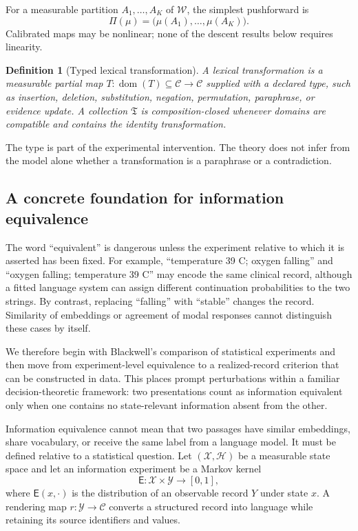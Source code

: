 \documentclass[11pt]{article}
\newtheorem{definition}{Definition}[section]
\newcommand{\Ctxt}{\mathcal C}
\newcommand{\Words}{\mathcal W}
\newcommand{\Trans}{\mathfrak T}
\newcommand{\Exp}{\mathsf E}
\begin{document}
For a measurable partition $A_1,\ldots,A_K$ of $\Words$, the simplest pushforward is
\[
\Pi(\mu)=\bigl(\mu(A_1),\ldots,\mu(A_K)\bigr).
\]
Calibrated maps may be nonlinear; none of the descent results below requires linearity.

\begin{definition}[Typed lexical transformation]
A lexical transformation is a measurable partial map $T:\operatorname{dom}(T)\subseteq\Ctxt\to\Ctxt$ supplied with a declared type, such as insertion, deletion, substitution, negation, permutation, paraphrase, or evidence update. A collection $\Trans$ is composition-closed whenever domains are compatible and contains the identity transformation.
\end{definition}

The type is part of the experimental intervention. The theory does not infer from the model alone whether a transformation is a paraphrase or a contradiction.

\subsection{A concrete foundation for information equivalence}

The word ``equivalent'' is dangerous unless the experiment relative to which
it is asserted has been fixed.  For example, ``temperature 39 C; oxygen
falling'' and ``oxygen falling; temperature 39 C'' may encode the same
clinical record, although a fitted language system can assign different
continuation probabilities to the two strings.  By contrast, replacing
``falling'' with ``stable'' changes the record.  Similarity of embeddings or
agreement of modal responses cannot distinguish these cases by itself.

We therefore begin with Blackwell's comparison of statistical experiments
\cite{blackwell1953} and then move from experiment-level equivalence to a
realized-record criterion that can be constructed in data.  This places prompt
perturbations within a familiar decision-theoretic framework: two
presentations count as information equivalent only when one contains no
state-relevant information absent from the other.

Information equivalence cannot mean that two passages have similar embeddings, share vocabulary, or receive the same label from a language model. It must be defined relative to a statistical question. Let $(\mathcal X,\mathcal H)$ be a measurable state space and let an information experiment be a Markov kernel
\[
 \Exp:\mathcal X\times\mathcal Y\longrightarrow[0,1],
\]
where $\Exp(x,\cdot)$ is the distribution of an observable record $Y$ under state $x$. A rendering map $r:\mathcal Y\to\Ctxt$ converts a structured record into language while retaining its source identifiers and values.
\end{document}
